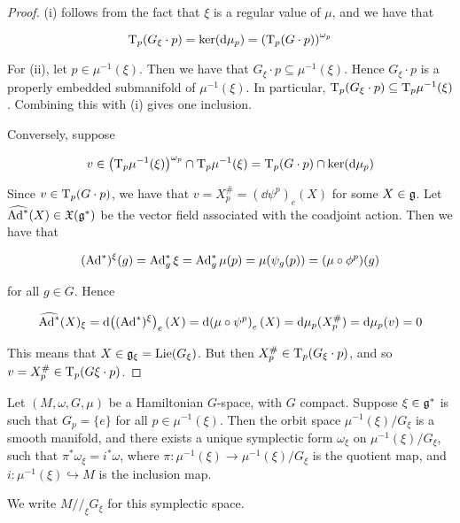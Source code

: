 \documentclass{article}
\newcommand{\sslash}{/\!/}
\DeclareMathOperator{\Lie}{Lie}
\begin{document}
\begin{proof}
    (i) follows from the fact that \(\xi\) is a regular value of \(\mu\), and we have that

    \[\mathrm{T}_p(G_\xi \cdot p) = \ker(\dd\mu_p) = \left(\mathrm{T}_p(G \cdot p)\right)^{\omega_p}\]

    For (ii), let \(p \in \mu^{-1}(\xi)\). Then we have that \(G_\xi \cdot p \subseteq \mu^{-1}(\xi)\). Hence \(G_\xi \cdot p\) is a properly embedded submanifold of \(\mu^{-1}(\xi)\). In particular, \(\mathrm{T}_p(G_\xi \cdot p) \subseteq \mathrm{T}_p\mu^{-1}(\xi)\). Combining this with (i) gives one inclusion.

    Conversely, suppose

    \[v \in \left(\mathrm{T}_p\mu^{-1}(\xi)\right)^{\omega_p} \cap \mathrm{T}_p\mu^{-1}(\xi) = \mathrm{T}_p(G \cdot p) \cap \ker (\dd\mu_p)\]

    Since \(v \in \mathrm{T}_p(G \cdot p)\), we have that \(v = X^\#_p = (\dd\psi^p)_e(X)\) for some \(X \in \mathfrak{g}\). Let \(\widehat{\operatorname{Ad}^*}(X) \in \mathfrak X(\mathfrak{g}^*)\) be the vector field associated with the coadjoint action. Then we have that

    \[(\operatorname{Ad}^*)^\xi(g) = \operatorname{Ad}_g^*\xi = \operatorname{Ad}_g^*\mu(p) = \mu(\psi_g(p)) = (\mu \circ \phi^p)(g)\]

    for all \(g \in G\). Hence

    \[\widehat{\operatorname{Ad}^*}(X)_\xi = \dd ((\operatorname{Ad}^*)^\xi)_e(X) = \dd(\mu \circ \psi^p)_e(X) = \dd\mu_p(X^\#_p) = \dd\mu_p(v) = 0\]

    This means that \(X \in \mfg_\xi = \Lie(G_\xi)\). But then \(X_p^\# \in \mathrm{T}_p(G_\xi \cdot p)\), and so \(v = X_p^\# \in \mathrm{T}_p(G\xi \cdot p)\).
\end{proof}

\begin{theorem}
     Let \((M, \omega, G, \mu)\) be a Hamiltonian \(G\)-space, with \(G\) compact. Suppose \(\xi \in \mathfrak{g}^*\) is such that \(G_p = \{e\}\) for all \(p \in \mu^{-1}(\xi)\). Then the orbit space \(\mu^{-1}(\xi)/G_\xi\) is a smooth manifold, and there exists a unique symplectic form \(\omega_\xi\) on \(\mu^{-1}(\xi)/G_\xi\), such that \(\pi^*\omega_\xi = i^*\omega\), where \(\pi : \mu^{-1}(\xi) \to \mu^{-1}(\xi)/G_\xi\) is the quotient map, and \(i : \mu^{-1}(\xi) \hookrightarrow M\) is the inclusion map.

    We write \(M \sslash_\xi G_\xi\) for this symplectic space.
\end{theorem}
\end{document}
